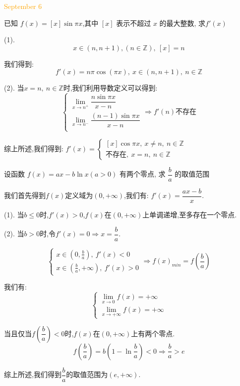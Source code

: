 \textcolor{orange}{September 6}

\begin{example}[][Exam: 35.1.11]
	已知 $f(x)=[x]\sin \pi x$,其中 $[x]$ 表示不超过 $x$ 的最大整数, 求$f'(x)$
\end{example}
\begin{solution}

	(1). 
	$$x\in(n,n+1),(n\in\mathbb{Z}),\ [x]=n$$
	
	我们得到:  $$f'(x)=n\pi\cos(\pi x),\ x\in(n,n+1), \ n\in\mathbb{Z}$$
	
	(2). 当$x=n,\ n\in\mathbb{Z}$时,我们利用导数定义可以得到:  
	$$\left\lbrace
	\begin{array}{l}
		\lim\limits_{x\to n^{+}}\dfrac{n\sin \pi x}{x-n}\\
		\lim\limits_{x\to n^{-}}\dfrac{(n-1)\sin \pi x}{x-n}\\
	\end{array}
	\right.\Rightarrow f'(n)\text{不存在}$$
	
	综上所述,我们得到:  $f'(x)=\left\lbrace
	\begin{array}{l}
		[x]\cos \pi x,\ x\neq n,\ n\in\mathbb{Z}\\
		\text{不存在},\ x=n,\ n\in\mathbb{Z}
	\end{array}
	\right. $
\end{solution}

\begin{example}[][Exam: 35.1.12]
	设函数 $f(x)=ax-b\ln x(a>0)$ 有两个零点, 求 $\dfrac{b}{a}$ 的取值范围
\end{example}
\begin{solution}

	我们首先得到$f(x)$定义域为$(0,+\infty)$,我们有:  $f'(x)=\dfrac{ax-b}{x}$.
	
	(1). 当$b\leq 0$时,$f'(x)>0$,$f(x)$在$(0,+\infty)$上单调递增,至多存在一个零点.
	
	(2). 当$b>0$时,令$f'(x)=0\Rightarrow x=\dfrac{b}{a}$.
	
	$$\left\lbrace
	\begin{array}{l}
		x\in(0,\frac{b}{a}),\ f'(x)<0\\
		x\in(\frac{b}{a},+\infty),\ f'(x)>0
	\end{array}
	\right. \Rightarrow f(x)_{min}=f(\dfrac{b}{a})$$
	
	我们有:  $$\left\lbrace
	\begin{array}{l}
		\lim\limits_{x\to 0}f(x)=+\infty\\
		\lim\limits_{x\to +\infty}f(x)=+\infty
	\end{array}
	\right. $$
	
	当且仅当$f(\dfrac{b}{a})<0$时,$f(x)$在$(0,+\infty)$上有两个零点.
	$$f(\dfrac{b}{a})=b(1-\ln\dfrac{b}{a})<0\Rightarrow \dfrac{b}{a}>e$$
	
	综上所述,我们得到$\dfrac{b}{a}$的取值范围为$(e,+\infty)$.
\end{solution}


